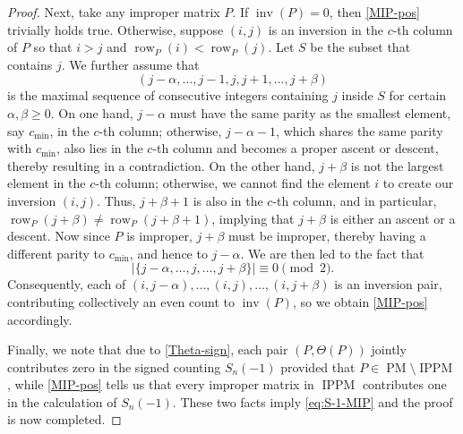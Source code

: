 \documentclass[12pt,reqno]{amsart}
\numberwithin{equation}{section}
\theoremstyle{theorem}
\theoremstyle{definition}
\theoremstyle{named}
\newcommand{\MatP}{\operatorname{PM}}
\newcommand{\row}{\operatorname{row}}
\newcommand{\inv}{\operatorname{inv}}
\newcommand{\IPPM}{\operatorname{IPPM}}
\begin{document}
\begin{proof}
	Next, take any improper matrix $P$. If $\inv(P)=0$, then \eqref{MIP-pos} trivially holds true. Otherwise, suppose $(i,j)$ is an inversion in the $c$-th column of $P$ so that $i>j$ and $\row_P(i)<\row_P(j)$. Let $S$ be the subset that contains $j$. We further assume that 
	$$(j-\alpha,\ldots,j-1,j,j+1,\ldots,j+\beta)$$
	is the maximal sequence of consecutive integers containing $j$ inside $S$ for certain $\alpha,\beta\ge 0$. On one hand, $j-\alpha$ must have the same parity as the smallest element, say $c_{\min}$, in the $c$-th column; otherwise, $j-\alpha-1$, which shares the same parity with $c_{\min}$, also lies in the $c$-th column and becomes a proper ascent or descent, thereby resulting in a contradiction. On the other hand, $j+\beta$ is not the largest element in the $c$-th column; otherwise, we cannot find the element $i$ to create our inversion $(i,j)$. Thus, $j+\beta+1$ is also in the $c$-th column, and in particular, $\row_P(j+\beta)\neq\row_P(j+\beta+1)$, implying that $j+\beta$ is either an ascent or a descent. Now since $P$ is improper, $j+\beta$ must be improper, thereby having a different parity to $c_{\min}$, and hence to $j-\alpha$. We are then led to the fact that 
	$$|\{j-\alpha,\ldots,j,\ldots,j+\beta\}|\equiv 0\pmod 2.$$
	Consequently, each of $(i,j-\alpha),\ldots,(i,j),\ldots,(i,j+\beta)$ is an inversion pair, contributing collectively an even count to $\inv(P)$, so we obtain \eqref{MIP-pos} accordingly.
	
	Finally, we note that due to \eqref{Theta-sign}, each pair $(P,\Theta(P))$ jointly contributes zero in the signed counting $S_n(-1)$ provided that $P\in\MatP\setminus\IPPM$, while \eqref{MIP-pos} tells us that every improper matrix in $\IPPM$ contributes one in the calculation of $S_n(-1)$. These two facts imply \eqref{eq:S-1-MIP} and the proof is now completed.
\end{proof}
\end{document}
